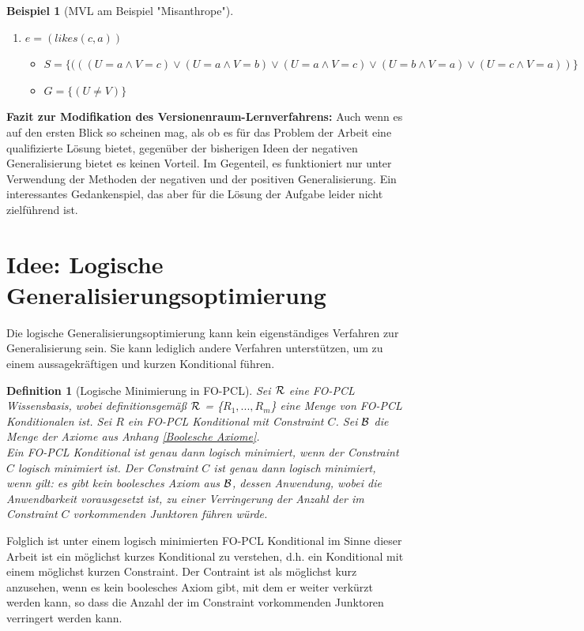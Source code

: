 \documentclass[a4paper, 11pt]{book}
\newtheorem{Def}{Definition }[section]
\newtheorem{Bsp}{Beispiel}[section]
\begin{document}
\begin{Bsp}[MVL am Beispiel "{}Misanthrope"{}]
\begin{itemize}
\begin{enumerate}
\begin{itemize}
			\item $ G = \{(U \neq V)\} $
		\end{itemize}
		\item $ e = (likes(c,a)) $
		\begin{itemize}
			\item $ S = \{(((U = a \land V = c) \lor (U = a \land V = b) \lor (U = a \land V = c) \lor (U = b \land V = a) \lor (U = c \land V = a))\}$ 
			\item $ G = \{(U \neq V)\} $
		\end{itemize}	
	\end{enumerate}
\end{itemize}
\end{Bsp}
\textbf{{\large Fazit zur Modifikation des Versionenraum-Lernverfahrens:}} \label{Fazit VRL} 
Auch wenn es auf den ersten Blick so scheinen mag, als ob es für das Problem der Arbeit eine qualifizierte Lösung bietet, gegenüber der bisherigen Ideen der negativen Generalisierung bietet es keinen Vorteil. Im Gegenteil, es funktioniert nur unter Verwendung der Methoden der negativen und der positiven Generalisierung. Ein interessantes Gedankenspiel, das aber für die Lösung der Aufgabe leider nicht zielführend ist. 



\section{Idee: Logische Generalisierungsoptimierung} 
\label{Logische Generalisierung}


	Die logische Generalisierungsoptimierung kann kein eigenständiges Verfahren zur Generalisierung sein. Sie kann lediglich andere Verfahren unterstützen, um zu einem aussagekräftigen und kurzen Konditional führen.
\begin{Def}[Logische Minimierung in FO-PCL] \label{Logische Min} 
	Sei $\cal{R}$ eine FO-PCL Wissensbasis, wobei definitionsgemäß $\cal{R}$  = \{$ R_1, ..., R_m $\} eine Menge von FO-PCL Konditionalen ist. Sei $ R $ ein FO-PCL Konditional mit Constraint $ C $. Sei $ \cal B $ die Menge der Axiome aus Anhang \ref{Boolesche Axiome}.\\
	Ein FO-PCL Konditional ist genau dann logisch minimiert, wenn der Constraint $ C $ logisch minimiert ist. Der Constraint $ C $ ist genau dann logisch minimiert, wenn gilt: es gibt kein boolesches Axiom aus $\cal B  $, dessen Anwendung, wobei die Anwendbarkeit vorausgesetzt ist, zu einer Verringerung der Anzahl der im Constraint $ C $ vorkommenden Junktoren führen würde.
\end{Def}
Folglich ist unter einem logisch minimierten FO-PCL Konditional im Sinne dieser Arbeit ist ein möglichst kurzes Konditional zu verstehen, d.h. ein Konditional mit einem möglichst kurzen Constraint. Der Contraint ist als möglichst kurz anzusehen, wenn es kein boolesches Axiom gibt, mit dem er weiter verkürzt werden kann, so dass die Anzahl der im Constraint vorkommenden Junktoren verringert werden kann. 
\end{document}
